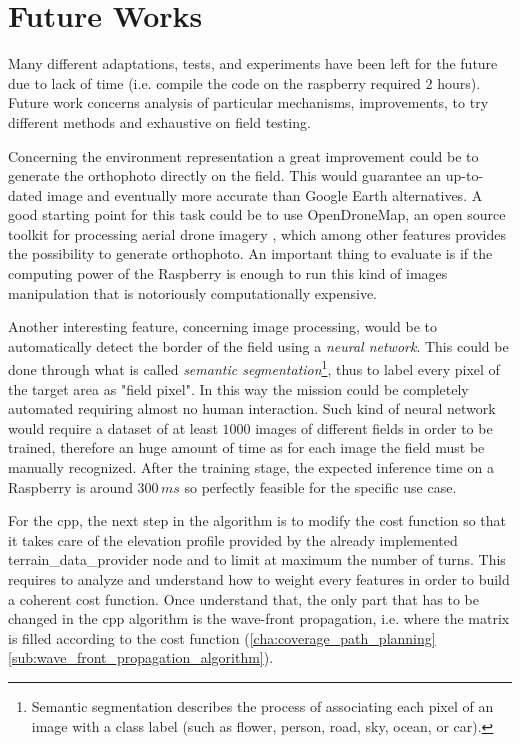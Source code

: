 \section{Future Works} %
\label{sec:future_work}
Many different adaptations, tests, and experiments have been left for the future due to lack of time (i.e. compile the code on the raspberry required $2$ hours). Future work concerns analysis of particular mechanisms, improvements, to try different methods and exhaustive on field testing.\par
Concerning the environment representation a great improvement could be to generate the orthophoto directly on the field. This would guarantee an up-to-dated image and eventually more accurate than Google Earth alternatives. A good starting point for this task could be to use \textsf{OpenDroneMap}, an open source toolkit for processing aerial drone imagery \cite{ODM}, which among other features provides the possibility to generate orthophoto. An important thing to evaluate is if the computing power of the Raspberry is enough to run this kind of images manipulation that is notoriously computationally expensive.\par
Another interesting feature, concerning image processing, would be to automatically detect the border of the field using a \textit{neural network}. This could be done through what is called \textit{semantic segmentation}\footnote{ Semantic segmentation describes the process of associating each pixel of an image with a class label (such as flower, person, road, sky, ocean, or car).}, thus to label every pixel of the target area as "field pixel". In this way the mission could be completely automated requiring almost no human interaction. Such kind of neural network would require a dataset of at least $1000$ images of different fields in order to be trained, therefore an huge amount of time as for each image the field must be manually recognized. After the training stage, the expected inference time on a Raspberry is around $300\, ms$ so perfectly feasible for the specific use case.\par
For the \acrfull{cpp}, the next step in the algorithm is to modify the cost function so that it takes care of the elevation profile provided by the already implemented \textsf{terrain\_data\_provider} node and to limit at maximum the number of turns. This requires to analyze and understand how to weight every features in order to build a coherent cost function. Once understand that, the only part that has to be changed in the \acrshort{cpp} algorithm is the wave-front propagation, i.e. where the matrix is filled according to the cost function (\autoref{cha:coverage_path_planning} \autoref{sub:wave_front_propagation_algorithm}).
